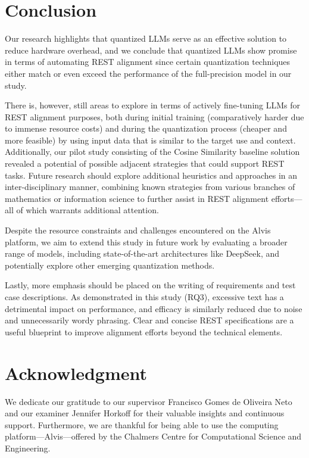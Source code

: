 \documentclass[conference]{IEEEtran}
\begin{document}
\section*{Conclusion}

Our research highlights that quantized LLMs serve as an effective solution to reduce hardware overhead, and we conclude that quantized LLMs show promise in terms of automating REST alignment since certain quantization techniques either match or even exceed the performance of the full-precision model in our study.

There is, however, still areas to explore in terms of actively fine-tuning LLMs for REST alignment purposes, both during initial training (comparatively harder due to immense resource costs) and during the quantization process (cheaper and more feasible) by using input data that is similar to the target use and context. Additionally, our pilot study consisting of the Cosine Similarity baseline solution revealed a potential of possible adjacent strategies that could support REST tasks. Future research should explore additional heuristics and approaches in an inter-disciplinary manner, combining known strategies from various branches of mathematics or information science to further assist in REST alignment efforts---all of which warrants additional attention.

Despite the resource constraints and challenges encountered on the Alvis platform, we aim to extend this study in future work by evaluating a broader range of models, including state-of-the-art architectures like DeepSeek, and potentially explore other emerging quantization methods.

Lastly, more emphasis should be placed on the writing of requirements and test case descriptions. As demonstrated in this study (RQ3), excessive text has a detrimental impact on performance, and efficacy is similarly reduced due to noise and unnecessarily wordy phrasing. Clear and concise REST specifications are a useful blueprint to improve alignment efforts beyond the technical elements.

\section*{Acknowledgment}

We dedicate our gratitude to our supervisor Francisco Gomes de Oliveira Neto and our examiner Jennifer Horkoff for their valuable insights and continuous support. Furthermore, we are thankful for being able to use the computing platform---Alvis---offered by the Chalmers Centre for Computational Science and Engineering.
\end{document}
